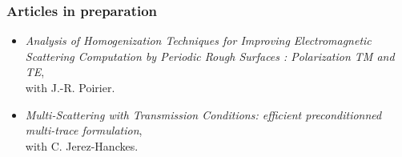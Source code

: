 \documentclass[a4paper,10pt,twoside]{article}
\begin{document}
\vspace{-0.65cm}

\subsubsection*{Articles in preparation}
\begin{itemize}
\item[\textbullet]
\emph{Analysis of
  Homogenization Techniques for Improving Electromagnetic Scattering
  Computation by Periodic Rough Surfaces : Polarization TM and TE},\\
with \textsf{J.-R. Poirier}.
\item[\textbullet]
  \emph{Multi-Scattering with Transmission Conditions: efficient
    preconditionned multi-trace formulation},\\
  with \textsf{C. Jerez-Hanckes}.
\end{itemize}

\vspace{-0.45cm}
\end{document}
